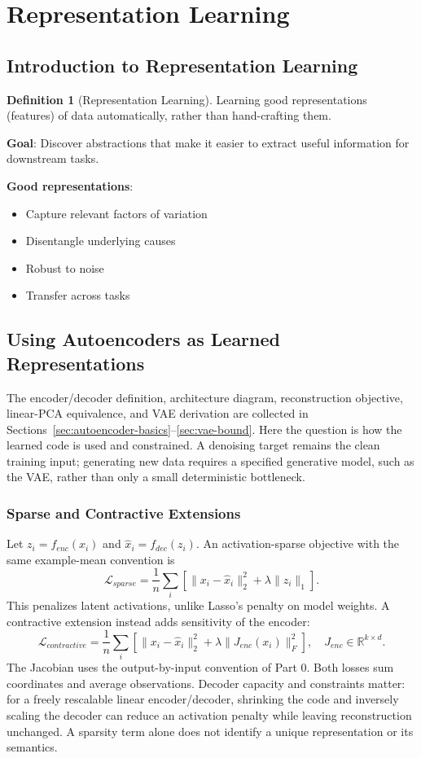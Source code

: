 \documentclass[11pt,twoside]{article}
\numberwithin{equation}{section}
\newcommand{\R}{\mathbb{R}}
\newcommand{\Loss}{\mathcal{L}}
\theoremstyle{plain}
\theoremstyle{definition}
\newtheorem{definition}[theorem]{Definition}
\theoremstyle{remark}
\begin{document}
\section{Representation Learning}
\label{sec:representation-learning}

\subsection{Introduction to Representation Learning}

\begin{definition}[Representation Learning]
Learning good representations (features) of data automatically, rather than hand-crafting them.

\textbf{Goal}: Discover abstractions that make it easier to extract useful information for downstream tasks.

\textbf{Good representations}:
\begin{itemize}
\item Capture relevant factors of variation
\item Disentangle underlying causes
\item Robust to noise
\item Transfer across tasks
\end{itemize}
\end{definition}

\subsection{Using Autoencoders as Learned Representations}
\label{sec:ae-applications}
The encoder/decoder definition, architecture diagram, reconstruction objective,
linear-PCA equivalence, and VAE derivation are collected in
Sections~\ref{sec:autoencoder-basics}--\ref{sec:vae-bound}.
Here the question is how the learned code is used and constrained.
A denoising target remains the clean training input; generating new data
requires a specified generative model, such as the VAE, rather than only a
small deterministic bottleneck.

\subsubsection{Sparse and Contractive Extensions}
Let $z_i=f_{enc}(x_i)$ and $\hat x_i=f_{dec}(z_i)$. An activation-sparse
objective with the same example-mean convention is
\[
\Loss_{sparse}=\frac1n\sum_i\left[\|x_i-\hat x_i\|_2^2
 +\lambda\|z_i\|_1\right].
\]
This penalizes latent activations, unlike Lasso's penalty on model weights.
A contractive extension instead adds sensitivity of the encoder:
\[
\Loss_{contractive}=\frac1n\sum_i\left[\|x_i-\hat x_i\|_2^2
 +\lambda\|J_{enc}(x_i)\|_F^2\right],
\quad J_{enc}\in\R^{k\times d}.
\]
The Jacobian uses the output-by-input convention of Part 0. Both losses sum
coordinates and average observations. Decoder capacity and constraints matter:
for a freely rescalable linear encoder/decoder, shrinking the code and
inversely scaling the decoder can reduce an activation penalty while leaving
reconstruction unchanged. A sparsity term alone does not identify a unique
representation or its semantics.
\end{document}
